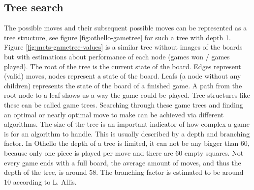 \documentclass[
11pt, %
english, %
singlespacing, %
headsepline, %
]{MastersDoctoralThesis} %
\begin{document}
\subsection{Tree search}
The possible moves and their subsequent possible moves can be represented as a tree structure, see figure \ref{fig:othello-gametree} for such a tree with depth 1. Figure \ref{fig:mcts-gametree-values} is a similar tree without images of the boards but with estimations about performance of each node (games won / games played). The root of the tree is the current state of the board. Edges represent (valid) moves, nodes represent a state of the board. Leafs (a node without any children) represents the state of the board of a finished game. A path from the root node to a leaf shows us a way the game could be played. Tree structures like these can be called game trees. Searching through these game trees and finding an optimal or nearly optimal move to make can be achieved via different algorithms. The size of the tree is an important indicator of how complex a game is for an algorithm to handle. This is usually described by a depth and branching factor. In Othello the depth of a tree is limited, it can not be any bigger than 60, because only one piece is played per move and there are 60 empty squares. Not every game ends with a full board, the average amount of moves, and thus the depth of the tree, is around 58. The branching factor is estimated to be around 10 according to L. Allis\cite{Allis:1994}.
\end{document}
